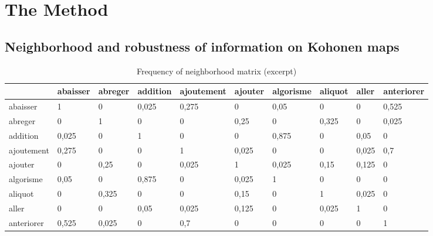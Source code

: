 \documentclass[runningheads,a4paper]{llncs}
\begin{document}
\section{The Method}

\subsection{Neighborhood and robustness of information on Kohonen maps}
\label{m1}

\begin{table}
\begin{tabular}{|l|l|l|l|l|l|l|l|l|l|}
\hline
 & abaisser & abreger & addition & ajoutement & ajouter & algorisme & aliquot & aller & anteriorer \\ \hline
abaisser  & \cellcolor{gris} 1 & 0 & \cellcolor{grisclair} 0,025 & \cellcolor{gris} 0,275 & 0 & \cellcolor{grisclair} 0,05 & 0 & 0 & \cellcolor{gris} 0,525\\ \hline
abreger & 0 & \cellcolor{gris} 1 & 0 & 0 & \cellcolor{gris} 0,25 & 0 & \cellcolor{gris} 0,325 & 0 & \cellcolor{grisclair} 0,025\\ \hline
addition & \cellcolor{grisclair} 0,025 & 0 & \cellcolor{gris} 1 & 0 & 0 & \cellcolor{gris} 0,875 & 0 & \cellcolor{grisclair} 0,05 & 0\\ \hline
ajoutement  & \cellcolor{gris} 0,275 & 0 & 0 & \cellcolor{gris} 1 & \cellcolor{grisclair} 0,025 & 0 & 0 & \cellcolor{grisclair} 0,025 & \cellcolor{gris} 0,7\\ \hline
ajouter & 0 & \cellcolor{gris} 0,25 & 0 & \cellcolor{grisclair} 0,025 & \cellcolor{gris} 1 & \cellcolor{grisclair} 0,025 & \cellcolor{grisclair} 0,15 & \cellcolor{grisclair} 0,125 & 0\\ \hline
algorisme & \cellcolor{grisclair} 0,05 & 0 & \cellcolor{gris} 0,875 & 0 & \cellcolor{grisclair} 0,025 & \cellcolor{gris} 1 & 0 & 0 & 0\\ \hline
aliquot & 0 & \cellcolor{gris} 0,325 & 0 & 0 & \cellcolor{grisclair} 0,15 & 0 & \cellcolor{gris} 1 & \cellcolor{grisclair} 0,025 & 0\\ \hline
aller & 0 & 0 & \cellcolor{grisclair} 0,05 & \cellcolor{grisclair} 0,025 & \cellcolor{grisclair} 0,125 & 0 & \cellcolor{grisclair} 0,025 & \cellcolor{gris} 1 & 0\\ \hline
anteriorer & \cellcolor{gris} 0,525 & \cellcolor{grisclair} 0,025 & 0 & \cellcolor{gris} 0,7 & 0 & 0 & 0 & 0 & \cellcolor{gris} 1 \\ \hline
\end{tabular}

\caption{Frequency of neighborhood matrix (excerpt)}
\label{bertin1}
\end{table}
\end{document}
